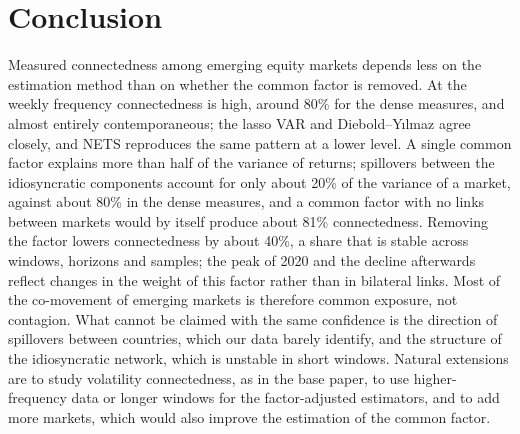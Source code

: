 \section{Conclusion}
Measured connectedness among emerging equity markets depends less on the estimation method than on whether the common factor is removed. At the weekly frequency connectedness is high, around 80\% for the dense measures, and almost entirely contemporaneous; the lasso VAR and Diebold--Y{\i}lmaz agree closely, and NETS reproduces the same pattern at a lower level. A single common factor explains more than half of the variance of returns; spillovers between the idiosyncratic components account for only about 20\% of the variance of a market, against about 80\% in the dense measures, and a common factor with no links between markets would by itself produce about 81\% connectedness. Removing the factor lowers connectedness by about 40\%, a share that is stable across windows, horizons and samples; the peak of 2020 and the decline afterwards reflect changes in the weight of this factor rather than in bilateral links. Most of the co-movement of emerging markets is therefore common exposure, not contagion. What cannot be claimed with the same confidence is the direction of spillovers between countries, which our data barely identify, and the structure of the idiosyncratic network, which is unstable in short windows. Natural extensions are to study volatility connectedness, as in the base paper, to use higher-frequency data or longer windows for the factor-adjusted estimators, and to add more markets, which would also improve the estimation of the common factor.
